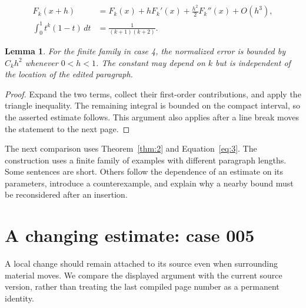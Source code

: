 \documentclass[a4paper,10pt]{article}
\newtheorem{lemma}[theorem]{Lemma}
\begin{document}
\lipsum[10-11]
\begin{align}\label{eq:3}
 F_k(x+h)&=F_k(x)+hF_k'(x)+\frac{h^2}{2}F_k''(x)+O(h^3),\\
 \int_0^1 t^k(1-t)\,dt&=\frac{1}{(k+1)(k+2)}.
\end{align}
\begin{lemma}\label{thm:3}
For the finite family in case 4, the normalized error is bounded by $C_k h^2$ whenever $0<h<1$. The constant may depend on $k$ but is independent of the location of the edited paragraph.
\end{lemma}
\begin{proof}
Expand the two terms, collect their first-order contributions, and apply the
triangle inequality. The remaining integral is bounded on the compact interval,
so the asserted estimate follows. This argument also applies after a line break
moves the statement to the next page.
\end{proof}
\begin{center}
\end{center}
The next comparison uses Theorem~\ref{thm:2} and Equation~\ref{eq:3}. The construction uses a finite family of examples with different paragraph lengths. Some sentences are short. Others follow the dependence of an estimate on its parameters, introduce a counterexample, and explain why a nearby bound must be reconsidered after an insertion.

\lipsum[18]

\section{A changing estimate: case 005}\label{unit:4}
A local change should remain attached to its source even when surrounding material moves. We compare the displayed argument with the current source version, rather than treating the last compiled page number as a permanent identity.
\end{document}
